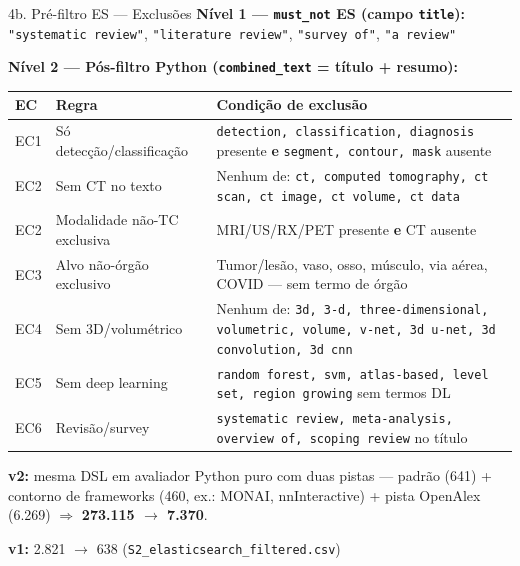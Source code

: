 \documentclass[aspectratio=169]{beamer}
\begin{document}
\begin{frame}{4b. Pré-filtro ES --- Exclusões}
\small
\textbf{Nível 1 --- \texttt{must\_not} ES (campo \texttt{title}):}
\quad\texttt{"systematic review"}, \texttt{"literature review"}, \texttt{"survey of"}, \texttt{"a review"}

\vspace{0.3em}
\textbf{Nível 2 --- Pós-filtro Python (\texttt{combined\_text} = título + resumo):}
\begin{table}
\centering\scriptsize
\begin{tabular}{l >{\raggedright\arraybackslash}p{4cm} >{\raggedright\arraybackslash}p{7.5cm}}
\toprule
\textbf{EC} & \textbf{Regra} & \textbf{Condição de exclusão} \\
\midrule
EC1 & Só detecção/classificação & \texttt{detection, classification, diagnosis} presente \textbf{e} \texttt{segment, contour, mask} ausente \\
EC2 & Sem CT no texto & Nenhum de: \texttt{ct\textvisiblespace, computed tomography, ct scan, ct image, ct volume, ct data} \\
EC2 & Modalidade não-TC exclusiva & MRI/US/RX/PET presente \textbf{e} CT ausente \\
EC3 & Alvo não-órgão exclusivo & Tumor/lesão, vaso, osso, músculo, via aérea, COVID --- sem termo de órgão \\
EC4 & Sem 3D/volumétrico & Nenhum de: \texttt{3d, 3-d, three-dimensional, volumetric, volume, v-net, 3d u-net, 3d convolution, 3d cnn} \\
EC5 & Sem deep learning & \texttt{random forest, svm, atlas-based, level set, region growing} sem termos DL \\
EC6 & Revisão/survey & \texttt{systematic review, meta-analysis, overview of, scoping review} no título \\
\bottomrule
\end{tabular}
\end{table}

\centering\small
\textbf{v2:} mesma DSL em avaliador Python puro com duas pistas --- padrão (641) + contorno de frameworks (460, ex.: MONAI, nnInteractive) + pista OpenAlex (6.269) $\Rightarrow$ \textbf{273.115 $\to$ 7.370}.

\textbf{v1:} 2.821 $\to$ 638 \quad (\texttt{S2\_elasticsearch\_filtered.csv})
\end{frame}

\end{document}
